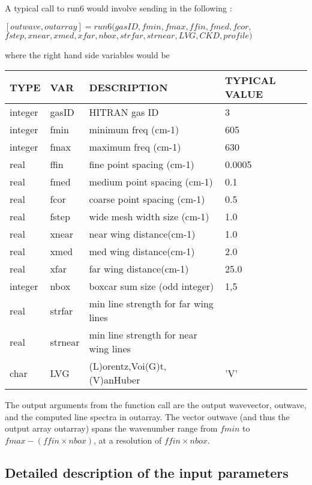 \documentclass[11pt]{article}
\begin{document}
A typical call to run6 would involve sending in the following : 

$[outwave,outarray]=run6(gasID,fmin,fmax,ffin,fmed,fcor,$\\
         $fstep,xnear,xmed,xfar,nbox,strfar,strnear,LVG,CKD,profile)$

where the right hand side variables would be 

\begin{longtable}{llll}
  TYPE  &   VAR  &         DESCRIPTION  &            TYPICAL VALUE\\
\hline
integer & gasID  &       HITRAN gas ID      &            3\\
\hline
integer & fmin    &      minimum freq (cm-1) &          605\\
integer & fmax    &      maximum freq (cm-1) &          630\\
\hline
real   &  ffin    &      fine point spacing (cm-1) &    0.0005\\
real   &  fmed    &      medium point spacing (cm-1)&   0.1\\
real   &  fcor    &      coarse point spacing (cm-1)  & 0.5\\
\hline
real   &  fstep   &      wide mesh width size (cm-1) &    1.0\\
real   &  xnear   &      near wing distance(cm-1)    &    1.0\\
real   &  xmed    &      med wing distance(cm-1)     &    2.0\\
real   &  xfar    &      far wing distance(cm-1)     &    25.0\\
\hline
integer & nbox     &     boxcar sum size (odd integer) &  1,5\\
\hline
real   &  strfar   &    min line strength for far wing lines & \\
real   &  strnear  &    min line strength for near wing lines& \\
\hline
char   &  LVG       &    (L)orentz,Voi(G)t,(V)anHuber  &  'V'\\
\hline
\end{longtable}

The output arguments from the function call are the output wavevector, 
outwave, and the computed line spectra in outarray. The vector outwave (and 
thus the output array outarray) spans the wavenumber range from $fmin$ to 
$fmax-(ffin \times  nbox)$, at a resolution of $ffin \times nbox$.

\subsection{Detailed description of the input parameters}
\end{document}
